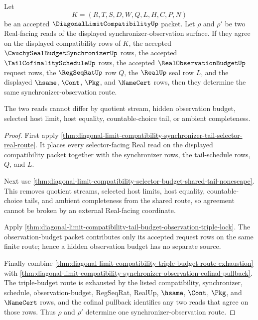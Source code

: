 \begin{theorem}
\label{thm:diagonal-limit-compatibility-synchronizer-observation-route-uniqueness}
Let
$$
K=(R,T,S,D,W,Q,L,H,C,P,N)
$$
be an accepted $\DiagonalLimitCompatibilityUp$ packet. Let $\rho$ and $\rho'$
be two Real-facing reads of the displayed synchronizer-observation surface. If
they agree on the displayed compatibility rows of $K$, the accepted
$\CauchySealBudgetSynchronizerUp$ rows, the accepted
$\TailCofinalityScheduleUp$ rows, the accepted $\RealObservationBudgetUp$
request rows, the $\RegSeqRatUp$ row $Q$, the $\RealUp$ seal row $L$, and the
displayed $\hsame$, $\Cont$, $\Pkg$, and $\NameCert$ rows, then they determine
the same synchronizer-observation route.

The two reads cannot differ by quotient stream, hidden observation budget,
selected host limit, host equality, countable-choice tail, or ambient
completeness.
\end{theorem}
\begin{proof}
First apply
\autoref{thm:diagonal-limit-compatibility-synchronizer-tail-selector-real-route}.
It places every selector-facing Real read on the displayed compatibility
packet together with the synchronizer rows, the tail-schedule rows, $Q$, and
$L$.

Next use
\autoref{thm:diagonal-limit-compatibility-selector-budget-shared-tail-nonescape}.
This removes quotient streams, selected host limits, host equality,
countable-choice tails, and ambient completeness from the shared route, so
agreement cannot be broken by an external Real-facing coordinate.

Apply
\autoref{thm:diagonal-limit-compatibility-tail-budget-observation-triple-lock}.
The observation-budget packet contributes only its accepted request rows on the
same finite route; hence a hidden observation budget has no separate source.

Finally combine
\autoref{thm:diagonal-limit-compatibility-triple-budget-route-exhaustion} with
\autoref{thm:diagonal-limit-compatibility-synchronizer-observation-cofinal-pullback}.
The triple-budget route is exhausted by the listed compatibility,
synchronizer, schedule, observation-budget, RegSeqRat, RealUp, $\hsame$,
$\Cont$, $\Pkg$, and $\NameCert$ rows, and the cofinal pullback identifies any
two reads that agree on those rows. Thus $\rho$ and $\rho'$ determine one
synchronizer-observation route.
\end{proof}
